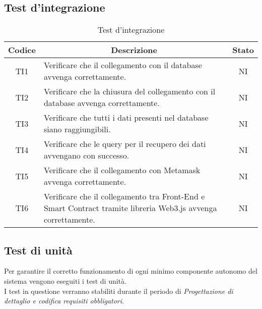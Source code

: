 \subsection{Test d'integrazione}\label{subsection:test_integrazione}
\begin{table}[H]
  \centering
  \renewcommand{\arraystretch}{1.8}
  \begin{tabular}{c|p{8cm}|c}
    \rowcolor[HTML]{125E28}
    \color[HTML]{FFFFFF}\textbf{Codice}
    & \multicolumn{1}{c}{\color[HTML]{FFFFFF}\textbf{Descrizione}}
    & \color[HTML]{FFFFFF}\textbf{Stato}\\
    \hline
    TI1 & Verificare che il collegamento con il database\glo{} avvenga correttamente. & NI \\
    TI2 & Verificare che la chiusura del collegamento con il database\glo{} avvenga correttamente. & NI \\
    TI3 & Verificare che tutti i dati presenti nel database\glo{} siano raggiungibili. & NI \\
    TI4 & Verificare che le query\glo{} per il recupero dei dati avvengano con successo. & NI \\
    TI5 & Verificare che il collegamento con Metamask avvenga correttamente. & NI \\
    TI6 & Verificare che il collegamento tra Front-End\glo{} e Smart Contract tramite libreria Web3.js avvenga correttamente. & NI \\
  \end{tabular}
  \caption{Test d'integrazione}
\end{table}

\subsection{Test di unità}\label{subsection:test_unita}
Per garantire il corretto funzionamento di ogni minimo componente autonomo del sistema vengono eseguiti i test di unità. \\
I test in questione verranno stabiliti durante il periodo di \textit{Progettazione di dettaglio e codifica requisiti obbligatori}.
